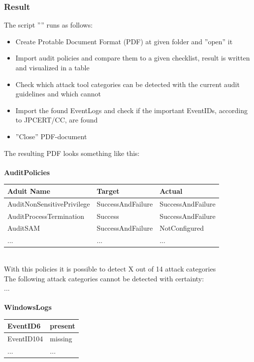 \subsubsection{Result} \label{resultVisualize}
The script '''' runs as follows:
\begin{itemize}
    \item Create Protable Document Format (PDF) at given folder and ''open'' it
    \item Import audit policies and compare them to a given checklist, result is written and visualized in a table
    \item Check which attack tool categories can be detected with the current audit guidelines and which cannot
    \item Import the found EventLogs and check if the important EventIDs, according to JPCERT/CC, are found
    \item ''Close'' PDF-document
\end{itemize}
The resulting PDF looks something like this: \ \\
\ \\
\textbf{AuditPolicies}
\begin{table}[H]
    \centering
    \begin{tabular}{| p{5.33cm} |  p{5.33cm} | p{5.33cm} |} \hline
        Aduit Name & Target & Actual \\ \hline
        AuditNonSensitivePrivilege & SuccessAndFailure &\cellcolor{green} SuccessAndFailure \\ \hline
        AuditProcessTermination & Success &\cellcolor{darkgreen} SuccessAndFailure \\ \hline
        AuditSAM & SuccessAndFailure &\cellcolor{red} NotConfigured \\ \hline
        ... & ... & ... \\ \hline
    \end{tabular}
\end{table}\ \\
With this policies it is possible to detect X out of 14 attack categories \ \\
The following attack categories cannot be detected with certainty: \\
... \ \\
\ \\
\textbf{WindowsLogs}
\begin{table}[H]
    \centering
    \begin{tabular}{| p{8cm} |  p{8cm} |} \hline
        EventID6 & present \\ \hline
        EventID104 & missing \\ \hline
        ... & ... \\ \hline
    \end{tabular}
\end{table}
